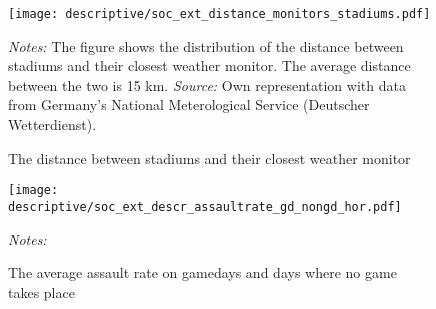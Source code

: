 \documentclass[11pt, a4paper, draft]{article} %
\begin{document}
\vspace*{\fill}
\begin{figure}[H]\centering
	\caption{The distance between stadiums and their closest weather monitor}\label{fig_soc_ext:hist_distance_stadium_monitors}
	\texttt{[image: descriptive/soc\_ext\_distance\_monitors\_stadiums.pdf]}
	\begin{minipage}{0.95\linewidth}
		\scriptsize{\emph{Notes:} The figure shows the distribution of the distance between stadiums and their closest weather monitor. The average distance between the two is 15 km. \newline \emph{Source:} Own representation with data from Germany's National Meterological Service (Deutscher Wetterdienst).}
	\end{minipage}
\end{figure}
\vspace*{\fill}\clearpage





\vspace*{\fill}
\begin{figure}[H]\centering
	\caption{The average assault rate on gamedays and days where no game takes place}\label{fig_soc_ext:}
	\texttt{[image: descriptive/soc\_ext\_descr\_assaultrate\_gd\_nongd\_hor.pdf]}
	\begin{minipage}{0.95\linewidth}
		\scriptsize{\emph{Notes:} }
	\end{minipage}
\end{figure}
\vspace*{\fill}\clearpage
\end{document}
